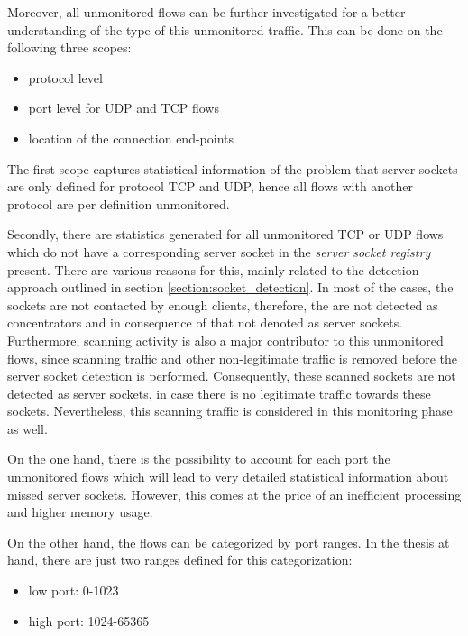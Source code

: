Moreover, all unmonitored flows can be further investigated for a better 
understanding of the type of this unmonitored traffic. This can be done on the 
following three scopes: 
\begin{itemize}
	\item protocol level 
	\item port level for \gls{UDP} and \gls{TCP} flows 
	\item location of the connection end-points 
\end{itemize}

The first scope captures statistical information of the problem that 
\glspl{server socket} are only defined for protocol \gls{TCP} and \gls{UDP}, 
hence all flows with another protocol are per definition unmonitored.

Secondly, there are statistics generated for all unmonitored \gls{TCP} or 
\gls{UDP} flows which do not have a corresponding \gls{server socket} in the 
\emph{server socket registry} present. There are various reasons for this, 
mainly related to the detection approach outlined in section 
\ref{section:socket_detection}. In most of the cases, the sockets are not 
contacted by enough clients, therefore, the are not detected as concentrators 
and in consequence of that not denoted as \glspl{server socket}. Furthermore, 
scanning activity is also a major contributor to this unmonitored flows, since 
scanning traffic and other non-legitimate traffic is removed before the 
\gls{server socket} detection is performed. Consequently, these scanned sockets 
are not detected as \glspl{server socket}, in case there is no legitimate 
traffic towards these sockets. Nevertheless, this scanning traffic is considered 
in this monitoring phase as well. 

On the one hand, there is the possibility to account for each port the 
unmonitored flows which will lead to very detailed statistical information about  
missed \glspl{server socket}. However, this comes at the price of an inefficient 
processing and higher memory usage. 

On the other hand, the flows can be categorized by port ranges. In the thesis at 
hand, there are just two ranges defined for this categorization:

\begin{itemize}
	\item low port: 0-1023 
	\item high port: 1024-65365 
\end{itemize}

